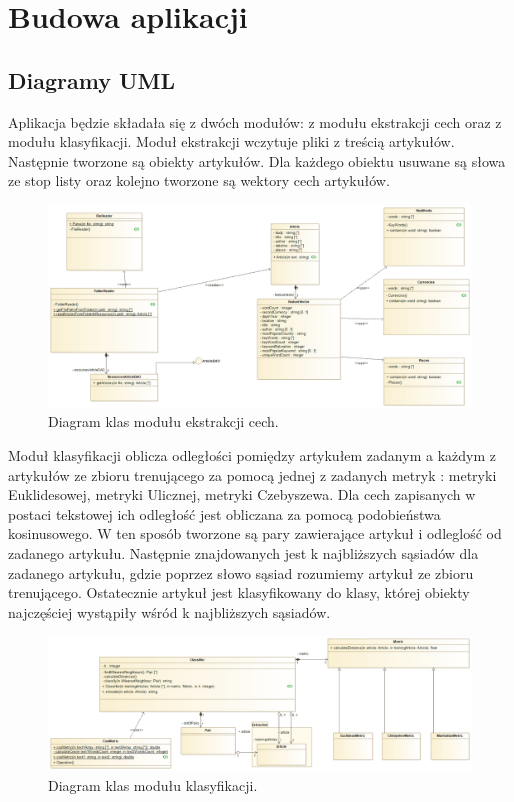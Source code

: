 \documentclass{classrep}
\begin{document}
\section{Budowa aplikacji}
\subsection{Diagramy UML}

Aplikacja będzie składała się z dwóch modułów: z modułu ekstrakcji cech oraz z modułu klasyfikacji. Moduł ekstrakcji wczytuje pliki z treścią artykułów. Następnie tworzone są obiekty artykułów. Dla każdego obiektu usuwane są słowa ze stop listy oraz kolejno tworzone są wektory cech artykułów. 

\begin{figure}[h!]
 \centering
 \includegraphics[width=14cm]{Ekstrakcja.png}
 \vspace{-0.3cm}
 \caption{Diagram klas modułu ekstrakcji cech. }
 \label{rysunek do eksperymentu 1 wariantu 1}
\end{figure}
\newpage

Moduł klasyfikacji oblicza odległości pomiędzy artykułem zadanym a każdym z artykułów ze zbioru trenującego za pomocą jednej z zadanych metryk \cite{dane} : metryki Euklidesowej, metryki Ulicznej, metryki Czebyszewa. Dla cech zapisanych w postaci tekstowej ich odległość jest obliczana za pomocą podobieństwa kosinusowego. W ten sposób tworzone są pary zawierające artykuł i odleglość od zadanego artykułu. Następnie znajdowanych jest k najbliższych sąsiadów dla zadanego artykułu, gdzie poprzez słowo sąsiad rozumiemy artykuł ze zbioru trenującego. Ostatecznie artykuł jest klasyfikowany do klasy, której obiekty najczęściej wystąpiły wśród k najbliższych sąsiadów. 

\begin{figure}[h!]
 \centering
 \includegraphics[width=14cm]{Klasyfikator.png}
 \vspace{-0.3cm}
 \caption{Diagram klas modułu klasyfikacji. }
 \label{rysunek do eksperymentu 1 wariantu 1}
\end{figure}
\end{document}

